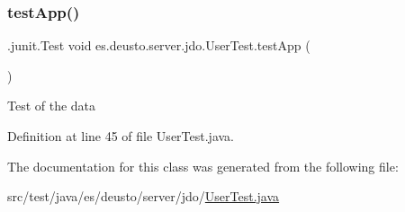 \subsubsection{\texorpdfstring{test\+App()}{testApp()}}
{\footnotesize\ttfamily .junit.\+Test void es.\+deusto.\+server.\+jdo.\+User\+Test.\+test\+App (\begin{DoxyParamCaption}{ }\end{DoxyParamCaption})}

Test of the data 

Definition at line 45 of file User\+Test.\+java.



The documentation for this class was generated from the following file\+:\begin{DoxyCompactItemize}
\item 
src/test/java/es/deusto/server/jdo/\hyperlink{_user_test_8java}{User\+Test.\+java}\end{DoxyCompactItemize}
